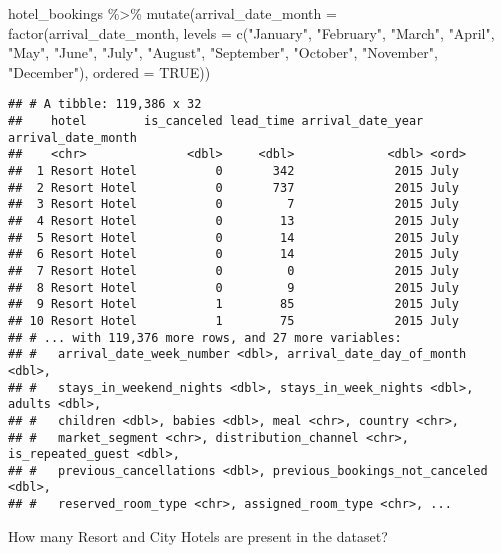 \documentclass[
]{article}
\newenvironment{Shaded}{\begin{snugshade}}{\end{snugshade}}
\newcommand{\AttributeTok}[1]{\textcolor[rgb]{0.77,0.63,0.00}{#1}}
\newcommand{\ConstantTok}[1]{\textcolor[rgb]{0.00,0.00,0.00}{#1}}
\newcommand{\FunctionTok}[1]{\textcolor[rgb]{0.00,0.00,0.00}{#1}}
\newcommand{\NormalTok}[1]{#1}
\newcommand{\SpecialCharTok}[1]{\textcolor[rgb]{0.00,0.00,0.00}{#1}}
\newcommand{\StringTok}[1]{\textcolor[rgb]{0.31,0.60,0.02}{#1}}
\begin{document}
\begin{Shaded}
\begin{Highlighting}[]
\NormalTok{hotel\_bookings }\SpecialCharTok{\%\textgreater{}\%} \FunctionTok{mutate}\NormalTok{(}\AttributeTok{arrival\_date\_month =} \FunctionTok{factor}\NormalTok{(arrival\_date\_month,}
    \AttributeTok{levels =} \FunctionTok{c}\NormalTok{(}\StringTok{"January"}\NormalTok{, }\StringTok{"February"}\NormalTok{, }\StringTok{"March"}\NormalTok{, }\StringTok{"April"}\NormalTok{, }\StringTok{"May"}\NormalTok{, }\StringTok{"June"}\NormalTok{, }\StringTok{"July"}\NormalTok{,}
    \StringTok{"August"}\NormalTok{, }\StringTok{"September"}\NormalTok{, }\StringTok{"October"}\NormalTok{, }\StringTok{"November"}\NormalTok{, }\StringTok{"December"}\NormalTok{), }\AttributeTok{ordered =} \ConstantTok{TRUE}\NormalTok{))}
\end{Highlighting}
\end{Shaded}

\begin{verbatim}
## # A tibble: 119,386 x 32
##    hotel        is_canceled lead_time arrival_date_year arrival_date_month
##    <chr>              <dbl>     <dbl>             <dbl> <ord>             
##  1 Resort Hotel           0       342              2015 July              
##  2 Resort Hotel           0       737              2015 July              
##  3 Resort Hotel           0         7              2015 July              
##  4 Resort Hotel           0        13              2015 July              
##  5 Resort Hotel           0        14              2015 July              
##  6 Resort Hotel           0        14              2015 July              
##  7 Resort Hotel           0         0              2015 July              
##  8 Resort Hotel           0         9              2015 July              
##  9 Resort Hotel           1        85              2015 July              
## 10 Resort Hotel           1        75              2015 July              
## # ... with 119,376 more rows, and 27 more variables:
## #   arrival_date_week_number <dbl>, arrival_date_day_of_month <dbl>,
## #   stays_in_weekend_nights <dbl>, stays_in_week_nights <dbl>, adults <dbl>,
## #   children <dbl>, babies <dbl>, meal <chr>, country <chr>,
## #   market_segment <chr>, distribution_channel <chr>, is_repeated_guest <dbl>,
## #   previous_cancellations <dbl>, previous_bookings_not_canceled <dbl>,
## #   reserved_room_type <chr>, assigned_room_type <chr>, ...
\end{verbatim}

How many Resort and City Hotels are present in the dataset?
\end{document}

